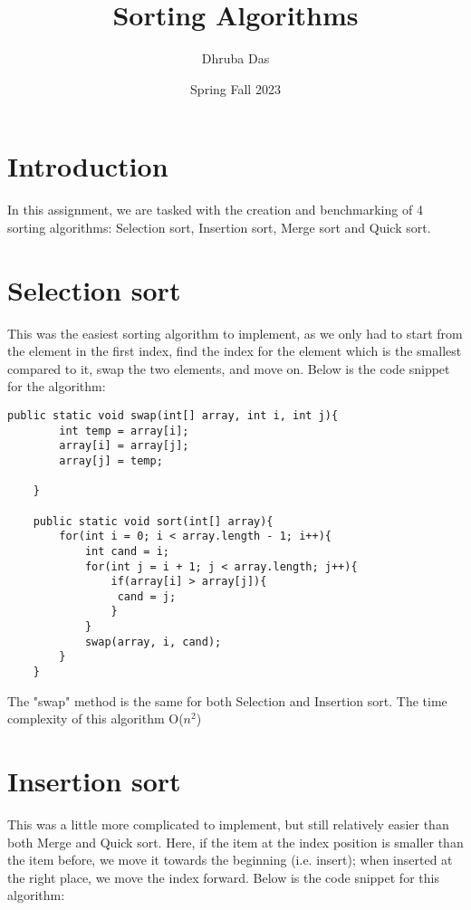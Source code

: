 \documentclass[a4paper,11pt]{article}
\begin{document}
\title{
    \textbf{Sorting Algorithms}
}
\author{Dhruba Das}
\date{Spring Fall 2023}

\maketitle

\section*{Introduction}
In this assignment, we are tasked with the creation and benchmarking of 4 sorting algorithms:  Selection sort, Insertion sort, Merge sort and Quick sort. 

\section*{Selection sort}

This was the easiest sorting algorithm to implement, as we only had to start from the element in the first index, find the index for the element which is the smallest compared to it, swap the two elements, and move on. Below is the code snippet for the algorithm:

\begin{verbatim}
public static void swap(int[] array, int i, int j){
        int temp = array[i];
        array[i] = array[j];
        array[j] = temp;

    }

    public static void sort(int[] array){
        for(int i = 0; i < array.length - 1; i++){
            int cand = i;
            for(int j = i + 1; j < array.length; j++){
                if(array[i] > array[j]){
                 cand = j;
                }
            }
            swap(array, i, cand);
        }
    }
\end{verbatim}
The "swap" method is the same for both Selection and Insertion sort. The time complexity of this algorithm O($n^{2}$)

\section*{Insertion sort}

This was a little more complicated to implement, but still relatively easier than both Merge and Quick sort.
Here, if the item at the index position is smaller than the item before, we move it towards the beginning (i.e. insert); when inserted at the right place, we move the index forward. 
Below is the code snippet for this algorithm:
\end{document}
